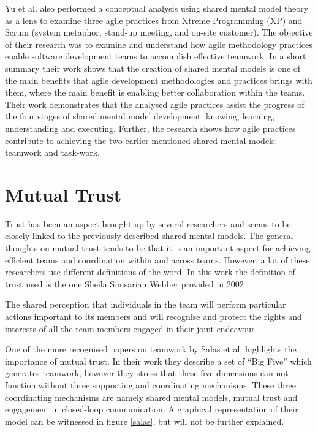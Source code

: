 Yu et al. \cite{Yu2014} also performed a conceptual analysis using shared mental model theory as a lens to examine three agile practices from Xtreme Programming (XP) and Scrum (system metaphor, stand-up meeting, and on-site customer). The objective of their research was to examine and understand how agile methodology practices enable software development teams to accomplish effective teamwork. In a short summary their work shows that the creation of shared mental models is one of the main benefits that agile development methodologies and practices brings with them, where the main benefit is enabling better collaboration within the teams. Their work demonstrates that the analysed agile practices assist the progress of the four stages of shared mental model development: knowing, learning, understanding and executing. Further, the research shows how agile practices contribute to achieving the two earlier mentioned shared mental models: teamwork and task-work.

\section{Mutual Trust}

Trust has been an aspect brought up by several researchers and seems to be closely linked to the previously described shared mental models. The general thoughts on mutual trust tends to be that it is an important aspect for achieving efficient teams and coordination within and across teams. However, a lot of these researchers use different definitions of the word. In this work the definition of trust used is the one Sheila Simsarian Webber provided in 2002 \cite{Webber2002}:

\begin{fancyquotes}
The shared perception that individuals in the team will perform particular actions important to its members and will recognise and protect the rights and interests of all the team members engaged in their joint endeavour.
\end{fancyquotes}

One of the more recognised papers on teamwork by Salas et al. \cite{Salas2005} highlights the importance of mutual trust. In their work they describe a set of ``Big Five'' which generates teamwork, however they stress that these five dimensions can not function without three supporting and coordinating mechanisms. These three coordinating mechanisms are namely shared mental models, mutual trust and engagement in closed-loop communication. A graphical representation of their model can be witnessed in figure \ref{salas}, but will not be further explained.

